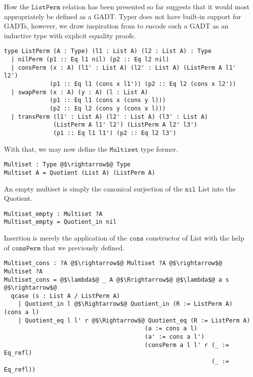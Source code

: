 \documentclass[12pt,twoside,maitrise]{dms}
\theoremstyle{definition}
\numberwithin{equation}{section}
\numberwithin{table}{chapter}
\numberwithin{figure}{chapter}
\newcommand\fn[1] {\texttt{#1}}
\begin{document}
How the $\fn{ListPerm}$ relation has been presented so far suggests that it
would most appropriately be defined as a GADT\@. Typer does not have built-in
support for GADTs, however, we draw inspiration from\cite{sulzmann2007systemfeq}
to encode such a GADT as an inductive type with explicit equality proofs.

\begin{verbatim}
type ListPerm (A : Type) (l1 : List A) (l2 : List A) : Type
  | nilPerm (p1 :: Eq l1 nil) (p2 :: Eq l2 nil)
  | consPerm (x : A) (l1' : List A) (l2' : List A) (ListPerm A l1' l2')
             (p1 :: Eq l1 (cons x l1')) (p2 :: Eq l2 (cons x l2'))
  | swapPerm (x : A) (y : A) (l : List A)
             (p1 :: Eq l1 (cons x (cons y l)))
             (p2 :: Eq l2 (cons y (cons x l)))
  | transPerm (l1' : List A) (l2' : List A) (l3' : List A)
              (ListPerm A l1' l2') (ListPerm A l2' l3')
              (p1 :: Eq l1 l1') (p2 :: Eq l2 l3')
\end{verbatim}

With that, we may now define the $\fn{Multiset}$ type former.

\begin{verbatim}
Multiset : Type @$\rightarrow$@ Type
Multiset A = Quotient (List A) (ListPerm A)
\end{verbatim}

An empty multiset is simply the canonical surjection of the $\fn{nil}$ List into
the Quotient.

\begin{verbatim}
Multiset_empty : Multiset ?A
Multiset_empty = Quotient_in nil
\end{verbatim}

Insertion is merely the application of the $\fn{cons}$ constructor of List with the help
of $\fn{consPerm}$ that we previously defined.

\begin{verbatim}
Multiset_cons : ?A @$\rightarrow$@ Multiset ?A @$\rightarrow$@ Multiset ?A
Multiset_cons = @$\lambda$@ _ A @$\Rrightarrow$@ @$\lambda$@ a s @$\rightarrow$@
  qcase (s : List A / ListPerm A)
    | Quotient_in l @$\Rightarrow$@ Quotient_in (R := ListPerm A) (cons a l)
    | Quotient_eq l l' r @$\Rightarrow$@ Quotient_eq (R := ListPerm A)
                                        (a := cons a l)
                                        (a' := cons a l')
                                        (consPerm a l l' r (_ := Eq_refl)
                                                           (_ := Eq_refl))
\end{verbatim}
\end{document}
